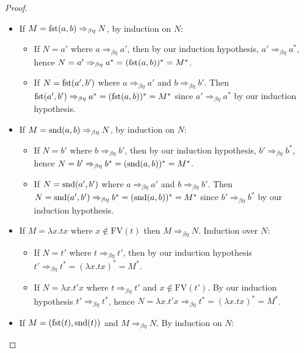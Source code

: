 \begin{proof}
\begin{itemize}
\begin{itemize}
        \end{itemize}
        \item If $M = \mathrm{fst}(a, b) \Rightarrow_{\beta\eta} N$, by induction on $N$:
        \begin{itemize}
            \item If $N= a'$ where $a \Rightarrow_{\beta\eta} a'$, then by our induction hypothesis, $a' \Rightarrow_{\beta\eta} a^*$, hence $N = a' \Rightarrow_{\beta\eta} a^* = (\mathrm{fst}(a, b))^* = M^*$.
            \item If $N = \mathrm{fst}(a', b')$ where $a \Rightarrow_{\beta\eta} a'$ and $b \Rightarrow_{\beta\eta} b'$. Then $\mathrm{fst}(a', b') \Rightarrow_{\beta\eta} a^* = (\mathrm{fst}(a, b))^* = M^*$ since $a' \Rightarrow_{\beta\eta} a^*$ by our induction hypothesis.
        \end{itemize}
        \item If $M = \mathrm{snd}(a, b) \Rightarrow_{\beta\eta} N$, by induction on $N$:
        \begin{itemize}
            \item If $N= b'$ where $b \Rightarrow_{\beta\eta} b'$, then by our induction hypothesis, $b' \Rightarrow_{\beta\eta} b^*$, hence $N = b' \Rightarrow_{\beta\eta} b^* = (\mathrm{snd}(a, b))^* = M^*$.
            \item If $N = \mathrm{snd}(a', b')$ where $a \Rightarrow_{\beta\eta} a'$ and $b \Rightarrow_{\beta\eta} b'$. Then $N = \mathrm{snd}(a', b') \Rightarrow_{\beta\eta} b^* = (\mathrm{snd}(a, b))^* = M^*$ since $b' \Rightarrow_{\beta\eta} b^*$ by our induction hypothesis.
        \end{itemize}
        \item If $M = \lambda x. t x$ where $x \not \in \mathrm{FV}(t)$ then $M \Rightarrow_{\beta\eta} N$. Induction over $N$:
        \begin{itemize}
            \item If $N = t'$ where $t \Rightarrow_{\beta\eta} t'$, then by our induction hypothesis $t' \Rightarrow_{\beta\eta} t^* = (\lambda x . t x)^* = M^*$.
            \item If $N = \lambda x . t' x$ where $t \Rightarrow_{\beta\eta} t'$ and $x \not \in \mathrm{FV}(t')$. By our induction hypothesis $t' \Rightarrow_{\beta\eta} t^*$, hence $N = \lambda x . t' x \Rightarrow_{\beta\eta} t^* = (\lambda x . t x)^* = M^*$.
        \end{itemize}
        \item If $M = (\mathrm{fst}(t), \mathrm{snd}(t))$ and $M \Rightarrow_{\beta\eta} N$. By induction on $N$:
        \begin{itemize}

\end{itemize}
\end{itemize}
\end{proof}
